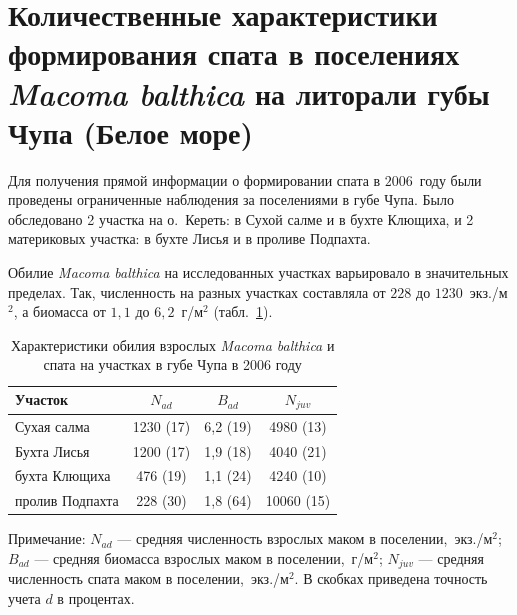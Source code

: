 	\section{Количественные характеристики формирования спата в поселениях {\it Macoma balthica}  на литорали губы Чупа (Белое море)}
Для получения прямой информации о формировании спата в $2006$~году были проведены ограниченные наблюдения за поселениями в губе Чупа.
Было обследовано 2 участка на о.~Кереть: в Сухой салме и в бухте Клющиха, и 2 материковых участка: в бухте Лисья и в проливе Подпахта.

Обилие {\it Macoma balthica} на исследованных участках варьировало в значительных пределах. 
Так, численность на разных участках составляла от $228$ до $1230$~экз./м$^2$, а биомасса от $1,1$ до $6,2$~г/м$^2$ (табл.~\ref{tab:NMacoma_recruitment}). 
\begin{table}[h]
\caption{Характеристики обилия взрослых {\it Macoma balthica} и спата на участках в губе Чупа в 2006 году}
\label{tab:NMacoma_recruitment}
\begin{center}
\begin{tabular}{|l|cc|c|}
\hline
Участок         & $N_{ad}$  & $B_{ad}$   & $N_{juv}$ \\ \hline
Сухая салма     & 1230 (17) & 6,2 (19) & 4980 (13)  \\  
Бухта Лисья     & 1200 (17) & 1,9 (18) & 4040 (21)  \\ 
бухта Клющиха   & 476 (19)  & 1,1 (24) & 4240 (10)  \\  
пролив Подпахта & 228 (30)  & 1,8 (64) & 10060 (15) \\ \hline
\end{tabular}
\end{center}

\footnotesize{Примечание: $N_{ad}$ --- средняя численность взрослых маком в поселении,~экз./м$^2$; 
$B_{ad}$ --- средняя биомасса взрослых маком в поселении,~г/м$^2$; 
$N_{juv}$ --- средняя численность спата маком в поселении,~экз./м$^2$. 
В скобках приведена точность учета $d$ в процентах.}
\end{table}


